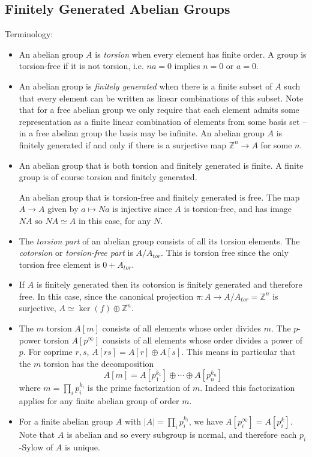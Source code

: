\documentclass{article}
\begin{document}
\subsection{Finitely Generated Abelian Groups}
Terminology:
\begin{itemize}
  \item{
    An abelian group $A$ is \emph{torsion} when every element has finite
    order. A group is torsion-free if it is not torsion, i.e. $na = 0$
    implies $n = 0$ or $a = 0$.
  }
  \item{
    An abelian group is \emph{finitely generated} when there is a
    finite subset of $A$ such that every element can be written as
    linear combinations of this subset. Note that for a free abelian group we
    only require that each element admits some representation as a
    finite linear combination of elements from some basis set -- in a
    free abelian group the basis may be infinite. An abelian group $A$
    is finitely generated if and only if there is a surjective map
    $\mathbb{Z}^n \to A$ for some $n$.
  }
  \item{
    An abelian group that is both torsion and finitely generated is
    finite. A finite group is of course torsion and finitely
    generated.

    An abelian group that is torsion-free and finitely generated is
    free. The map $A \to A$ given by $a \mapsto Na$ is injective
    since $A$ is torsion-free, and has image $NA$ so $NA \simeq A$ in
    this case, for any $N$.
  }
  \item{
    The \emph{torsion part} of an abelian group consists of all its
    torsion elements. The \emph{cotorsion} or \emph{torsion-free part}
    is $A / A_{tor}$. This is torsion free since the only torsion free
    element is $0 + A_{tor}$.
  }
  \item{
    If $A$ is finitely generated then its cotorsion is finitely
    generated and therefore free. In this case, since the canonical
    projection $\pi : A \to A / A_{tor} = \mathbb{Z}^n$ is surjective,
    $A \simeq \ker(f) \oplus \mathbb{Z}^n$.
  }
  \item{
    The $m$ torsion $A[m]$ consists of all elements whose order divides
    $m$. The $p$-power torsion $A[p^\infty]$ consists of all elements
    whose order divides a power of $p$. For coprime $r, s$,
    $A[rs] = A[r] \oplus A[s]$. This means in particular that the
    $m$ torsion has the decomposition
    $$
    A[m] = A[p_1^{k_1}] \oplus \cdots \oplus A[p_n^{k_n}]
    $$
    where $m = \prod_i p_i^{k_i}$ is the prime factorization of
    $m$. Indeed this factorization applies for any finite abelian
    group of order $m$.
  }
  \item{
    For a finite abelian group $A$ with
    $|A| = \prod_i p_i^{k_i}$, we have
    $A[p_i^\infty] = A[p_i^k]$. Note that $A$ is abelian and so every
    subgroup is normal, and therefore each $p_i$-Sylow of $A$ is
    unique.

}
\end{itemize}
\end{document}
